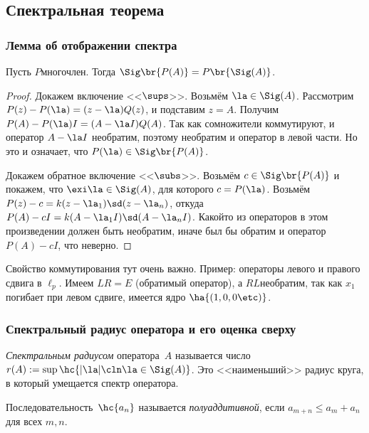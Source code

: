 \documentclass[a4paper]{article}
\begin{document}
\subsection{Спектральная теорема}

\subsubsection{Лемма об отображении спектра}

\begin{lemma}
Пусть $P$\т многочлен. Тогда $\Sig\br{P(A)} = P\br{\Sig(A)}$.
\end{lemma}
\begin{proof}
Докажем включение <<$\sups$>>. Возьмём $\la \in \Sig(A)$. Рассмотрим $P(z) - P(\la) = (z-\la)Q(z)$, и
подставим $z = A$. Получим $P(A) - P(\la)I = (A - \la I)Q(A)$. Так как сомножители коммутируют, и оператор
$A - \la I$ необратим, поэтому необратим и оператор в левой части. Но это и означает, что $P(\la) \in \Sig\br{P(A)}$.

Докажем обратное включение <<$\subs$>>. Возьмём $c \in \Sig\br{P(A)}$ и покажем, что $\exi \la \in \Sig(A)$,
для которого $c = P(\la)$. Возьмём $P(z) - c = k(z-\la_1)\sd (z-\la_n)$, откуда
$P(A) - c I = k(A - \la_1 I)\sd (A - \la_n I)$. Какой\д то из операторов в этом произведении должен быть
необратим, иначе был бы обратим и оператор $P(A) - cI$, что неверно.
\end{proof}

\begin{note}
Свойство коммутирования тут очень важно. Пример: операторы левого и правого сдвига в $\ell_p$. Имеем $LR=E$
( обратимый оператор), а $RL$\т необратим, так как $x_1$ погибает при левом сдвиге,  имеется ядро $\ha{(1,0,0\etc)}$.
\end{note}

\subsubsection{Спектральный радиус оператора и его оценка сверху}

\begin{df}
\emph{Спектральным радиусом} оператора~$A$ называется число $r(A) := \sup\hc{|\la| \cln \la \in \Sig(A)}$.
Это <<наименьший>> радиус круга, в который умещается спектр оператора.
\end{df}

\begin{df}
Последовательность~$\hc{a_n}$ называется \emph{полуаддитивной}, если $a_{m+n} \le a_m + a_n$ для всех $m,n$.
\end{df}
\end{document}
